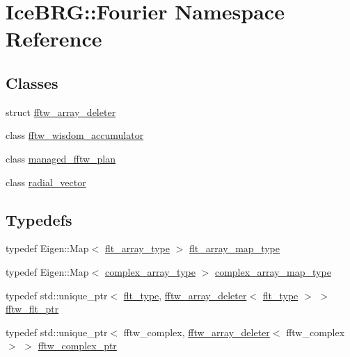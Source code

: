 \hypertarget{namespaceIceBRG_1_1Fourier}{}\section{Ice\+B\+R\+G\+:\+:Fourier Namespace Reference}
\label{namespaceIceBRG_1_1Fourier}
\subsection*{Classes}
\begin{DoxyCompactItemize}
\item 
struct \hyperlink{structIceBRG_1_1Fourier_1_1fftw__array__deleter}{fftw\+\_\+array\+\_\+deleter}
\item 
class \hyperlink{classIceBRG_1_1Fourier_1_1fftw__wisdom__accumulator}{fftw\+\_\+wisdom\+\_\+accumulator}
\item 
class \hyperlink{classIceBRG_1_1Fourier_1_1managed__fftw__plan}{managed\+\_\+fftw\+\_\+plan}
\item 
class \hyperlink{classIceBRG_1_1Fourier_1_1radial__vector}{radial\+\_\+vector}
\end{DoxyCompactItemize}
\subsection*{Typedefs}
\begin{DoxyCompactItemize}
\item 
typedef Eigen\+::\+Map$<$ \hyperlink{namespaceIceBRG_acdca5c05302480eba6ba053449643a6d}{flt\+\_\+array\+\_\+type} $>$ \hyperlink{namespaceIceBRG_1_1Fourier_a6fc544fe13bd85c16ab9f67052e1a882}{flt\+\_\+array\+\_\+map\+\_\+type}
\item 
typedef Eigen\+::\+Map$<$ \hyperlink{namespaceIceBRG_a02e79930ea75411b7883d2786b2fc5d7}{complex\+\_\+array\+\_\+type} $>$ \hyperlink{namespaceIceBRG_1_1Fourier_a647364fe9550c95ba04a10e0228b3c8d}{complex\+\_\+array\+\_\+map\+\_\+type}
\item 
typedef std\+::unique\+\_\+ptr$<$ \hyperlink{lib_2IceBRG__main_2common_8h_ad0f130a56eeb944d9ef2692ee881ecc4}{flt\+\_\+type}, \hyperlink{structIceBRG_1_1Fourier_1_1fftw__array__deleter}{fftw\+\_\+array\+\_\+deleter}$<$ \hyperlink{lib_2IceBRG__main_2common_8h_ad0f130a56eeb944d9ef2692ee881ecc4}{flt\+\_\+type} $>$ $>$ \hyperlink{namespaceIceBRG_1_1Fourier_ad7f59ed7cb7a3053346be0e1102a5af3}{fftw\+\_\+flt\+\_\+ptr}
\item 
typedef std\+::unique\+\_\+ptr$<$ fftw\+\_\+complex, \hyperlink{structIceBRG_1_1Fourier_1_1fftw__array__deleter}{fftw\+\_\+array\+\_\+deleter}$<$ fftw\+\_\+complex $>$ $>$ \hyperlink{namespaceIceBRG_1_1Fourier_adbfb704fc18fb22a63f5d6c6b080fcd1}{fftw\+\_\+complex\+\_\+ptr}
\end{DoxyCompactItemize}
